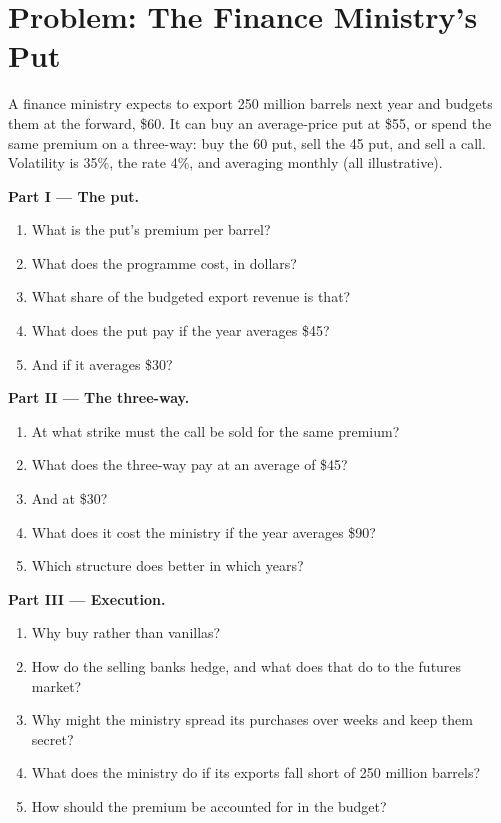 \section{Problem: The Finance Ministry's Put}

\begin{problem}\label{pb:m3:commodity-options-and-structured-hedges:1}
A finance ministry expects to export 250 million barrels next year and budgets them at the forward, \$60. It
can buy an average-price put at \$55, or spend the same premium on a three-way: buy the 60 put, sell the 45
put, and sell a call. Volatility is 35\%, the rate 4\%, and averaging monthly (all illustrative).

\medskip\noindent\textbf{Part I --- The put.}
\begin{enumerate}
\item What is the put's premium per barrel?
\item What does the programme cost, in dollars?
\item What share of the budgeted export revenue is that?
\item What does the put pay if the year averages \$45?
\item And if it averages \$30?
\end{enumerate}

\medskip\noindent\textbf{Part II --- The three-way.}
\begin{enumerate}[resume]
\item At what strike must the call be sold for the same premium?
\item What does the three-way pay at an average of \$45?
\item And at \$30?
\item What does it cost the ministry if the year averages \$90?
\item Which structure does better in which years?
\end{enumerate}

\medskip\noindent\textbf{Part III --- Execution.}
\begin{enumerate}[resume]
\item Why buy  rather than vanillas?
\item How do the selling banks hedge, and what does that do to the futures market?
\item Why might the ministry spread its purchases over weeks and keep them secret?
\item What does the ministry do if its exports fall short of 250 million barrels?
\item How should the premium be accounted for in the budget?
\end{enumerate}


\end{problem}
